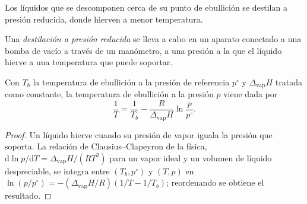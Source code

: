 Los líquidos que se descomponen cerca de su punto de ebullición se destilan a presión reducida, donde hierven
a menor temperatura.

\begin{definition}\label{def:b2:lab-techniques-2:reduced-pressure}
Una \emph{destilación a presión reducida} se lleva a cabo
en un aparato conectado a una bomba de vacío a través de un manómetro, a una presión a la que el líquido hierve a una
temperatura que puede soportar.
\end{definition}

\begin{proposition}\label{prop:b2:lab-techniques-2:reduced-pressure}
Con $T_b$ la temperatura de ebullición a la presión de referencia $p^\circ$ y $\Delta_{\mathrm{vap}}H$
tratada como constante, la temperatura de ebullición a la presión $p$ viene dada por
\begin{equation*}
\frac{1}{T} = \frac{1}{T_b} - \frac{R}{\Delta_{\mathrm{vap}}H}\ln\frac{p}{p^\circ}.
\end{equation*}
\end{proposition}

\begin{proof}
Un líquido hierve cuando su presión de vapor iguala la presión que soporta. La relación de Clausius--Clapeyron
de la física, $\mathrm d\ln p/\mathrm dT = \Delta_{\mathrm{vap}}H/(RT^2)$ para un vapor ideal y un
volumen de líquido despreciable, se integra entre $(T_b, p^\circ)$ y $(T, p)$ en $\ln(p/p^\circ) =
-(\Delta_{\mathrm{vap}}H/R)(1/T - 1/T_b)$; reordenando se obtiene el resultado.
\end{proof}


